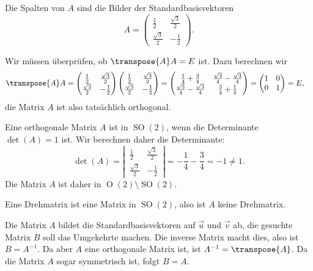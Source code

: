 \begin{loesung}
\begin{teilaufgaben}
\item Die Spalten von $A$ sind die Bilder der Standardbasisvektoren
\[
A=\begin{pmatrix}
\frac12         &\frac{\sqrt{3}}2\\
\frac{\sqrt{3}}2&-\frac12
\end{pmatrix}.
\]
\item Wir müssen überprüfen, ob $\transpose{A}A=E$ ist.
Dazu berechnen wir
\begin{align*}
\transpose{A}A
&=
\begin{pmatrix}
\frac12         &\frac{\sqrt{3}}2\\
\frac{\sqrt{3}}2&-\frac12
\end{pmatrix}
\begin{pmatrix}
\frac12         &\frac{\sqrt{3}}2\\
\frac{\sqrt{3}}2&-\frac12
\end{pmatrix}
=
\begin{pmatrix}
\frac14+\frac34&\frac{\sqrt{3}}{4}-\frac{\sqrt{3}}{4}\\
\frac{\sqrt{3}}{4}-\frac{\sqrt{3}}{4}&\frac34+\frac14
\end{pmatrix}
=
\begin{pmatrix}
1&0\\
0&1
\end{pmatrix}
=E,
\end{align*}
die Matrix $A$ ist also tatsächlich orthogonal.
\item
Eine orthogonale Matrix $A$ ist in $\operatorname{SO}(2)$, wenn die
Determinante $\det(A)=1$ ist.
Wir berechnen daher die Determinante:
\[
\det(A)
=
\left|\,\begin{matrix}
\frac12         &\frac{\sqrt{3}}2\\
\frac{\sqrt{3}}2&-\frac12
\end{matrix}\,\right|
=
-\frac14-\frac34
=
-1\ne 1.
\]
Die Matrix $A$ ist daher in $\operatorname{O}(2)\setminus\operatorname{SO}(2)$.
\item
Eine Drehmatrix ist eine Matrix in $\operatorname{SO}(2)$, also ist
$A$ keine Drehmatrix.
\item
Die Matrix $A$ bildet die Standardbasisvektoren auf $\vec u$ und $\vec v$
ab, die gesuchte Matrix $B$ soll das Umgekehrte machen.
Die inverse Matrix macht dies, also ist $B=A^{-1}$.
Da aber $A$ eine orthogonale Matrix ist, ist $A^{-1}=\transpose{A}$.
Da die Matrix $A$ sogar symmetrisch ist, folgt $B=A$.
\end{teilaufgaben}
\end{loesung}



